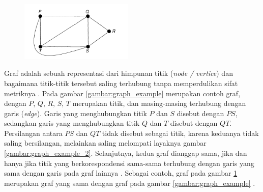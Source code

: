 \documentclass[
	a4paper, %
	12pt, %
	unnumberedsections, %
	twoside, %
]{LTJournalArticle}
\begin{document}
\begin{figure}
	\centering
	\includegraphics[keepaspectratio, width=0.48\textwidth]{gambar/graph_example_3}
	\caption{}
	\label{gambar:graph_example_3}
\end{figure}

Graf adalah sebuah representasi dari himpunan titik (\textit{node / vertice}) dan bagaimana titik-titik tersebut saling terhubung tanpa memperdulikan sifat metriknya \citep{wilson1996}. Pada gambar \ref{gambar:graph_example} merupakan contoh graf, dengan $P$, $Q$, $R$, $S$, $T$ merupakan titik, dan masing-masing terhubung dengan garis (\textit{edge}). Garis yang menghubungkan titik $P$ dan $S$ disebut dengan $PS$, sedangkan garis yang menghubungkan titik $Q$ dan $T$ disebut dengan $QT$. Persilangan antara $PS$ dan $QT$ tidak disebut sebagai titik, karena keduanya tidak saling bersilangan, melainkan saling melompati layaknya gambar \ref{gambar:graph_example_2}. Selanjutnya, kedua graf dianggap sama, jika dan hanya jika titik yang berkorespondensi sama-sama terhubung dengan garis yang sama dengan garis pada graf lainnya \citep{wilson1996}. Sebagai contoh, graf pada gambar \ref{gambar:graph_example_3} merupakan graf yang sama dengan graf pada gambar \ref{gambar:graph_example} \citep{wilson1996}. 
\end{document}
